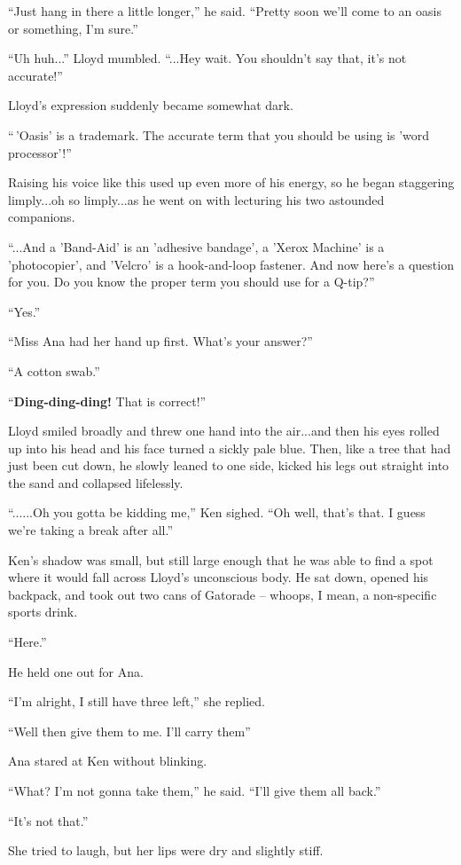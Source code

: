 \documentclass[
]{article}
\begin{document}
``Just hang in there a little longer,'' he said. ``Pretty soon we'll
come to an oasis or something, I'm sure.''

``Uh huh...'' Lloyd mumbled. ``...Hey wait. You shouldn't say that, it's
not accurate!''

Lloyd's expression suddenly became somewhat dark.

``\,'Oasis' is a trademark. The accurate term that you should be using
is 'word processor'!''

Raising his voice like this used up even more of his energy, so he began
staggering limply...oh so limply...as he went on with lecturing his two
astounded companions.

``...And a 'Band-Aid' is an 'adhesive bandage', a 'Xerox Machine' is a
'photocopier', and 'Velcro' is a hook-and-loop fastener. And now here's
a question for you. Do you know the proper term you should use for a
Q-tip?''

``Yes.''

``Miss Ana had her hand up first. What's your answer?''

``A cotton swab.''

``\textbf{Ding-ding-ding!} That is correct!''

Lloyd smiled broadly and threw one hand into the air...and then his eyes
rolled up into his head and his face turned a sickly pale blue. Then,
like a tree that had just been cut down, he slowly leaned to one side,
kicked his legs out straight into the sand and collapsed lifelessly.

``......Oh you gotta be kidding me,'' Ken sighed. ``Oh well, that's
that. I guess we're taking a break after all.''

Ken's shadow was small, but still large enough that he was able to find
a spot where it would fall across Lloyd's unconscious body. He sat down,
opened his backpack, and took out two cans of Gatorade -- whoops, I
mean, a non-specific sports drink.

``Here.''

He held one out for Ana.

``I'm alright, I still have three left,'' she replied.

``Well then give them to me. I'll carry them''

Ana stared at Ken without blinking.

``What? I'm not gonna take them,'' he said. ``I'll give them all back.''

``It's not that.''

She tried to laugh, but her lips were dry and slightly stiff.
\end{document}

